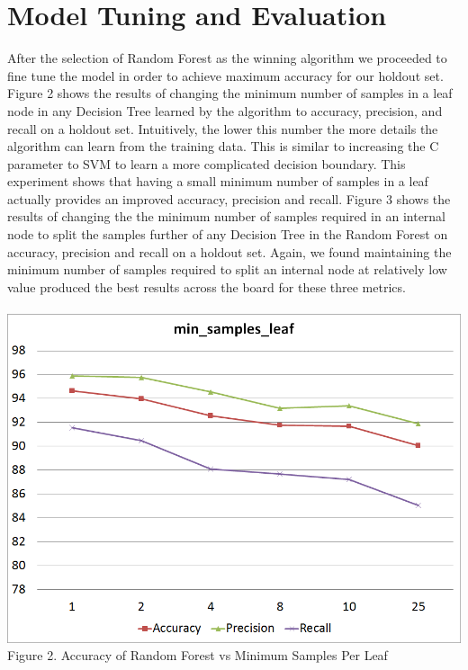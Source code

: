 \documentclass[twoside,11pt]{homework}
\begin{document}
\section*{Model Tuning and Evaluation}

After the selection of Random Forest as the winning algorithm we proceeded to fine tune the model in order to achieve
maximum accuracy for our holdout set.
Figure 2 shows the results of changing the minimum number of samples in a leaf node
in any Decision Tree learned by the algorithm to accuracy, precision, 
and recall on a holdout set. Intuitively, the lower this number the more details the algorithm can learn 
from the training data. This is similar to increasing the C parameter to SVM to learn a more complicated decision boundary.
This experiment shows that having a small minimum number of samples in a leaf actually provides an improved accuracy, precision and recall. 
Figure 3 shows the results of changing the  the minimum number of
samples required in an internal node to split the samples further of any Decision Tree in the Random Forest on
accuracy, precision and recall on a holdout set.
Again, we found maintaining the minimum number of samples required to split an internal node 
at relatively low value produced the best results across the board for these three metrics.
\\
\\
\includegraphics[scale=0.5]{min_leaf.png}
\\
Figure 2. Accuracy of Random Forest vs Minimum Samples Per Leaf
\\
\\
\end{document}
